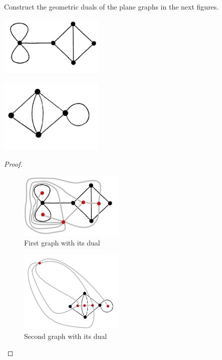 \prob
{
    Construct the geometric duals of the plane graphs in the next figures.
		    \begin{center}
                \includegraphics[width=5cm]{Test2/Problem10/Figure1_4.png}
            \end{center}\pn
						
			\begin{center}
                \includegraphics[width=5cm]{Test2/Problem10/Figure1_28.png}
            \end{center}\pn
}
\begin{proof}$\,$\pn
    \begin{figure}[H]
        \begin{center}
        \includegraphics[width=5cm]{Test2/Problem10/Figure1_4_Dual.png}
        \end{center}                            
        \caption{First graph with its dual}
        \label{t2:p9_Figure1_4_Dual.png}                        
    \end{figure}\pn       
    
    
    \begin{figure}[H]
        \begin{center}
        \includegraphics[width=5cm]{Test2/Problem10/Figure1_28_Dual.png}
        \end{center}                            
        \caption{Second graph with its dual}
        \label{t2:p9_Figure1_28_Dual.png}                        
    \end{figure}\pn    
\end{proof}